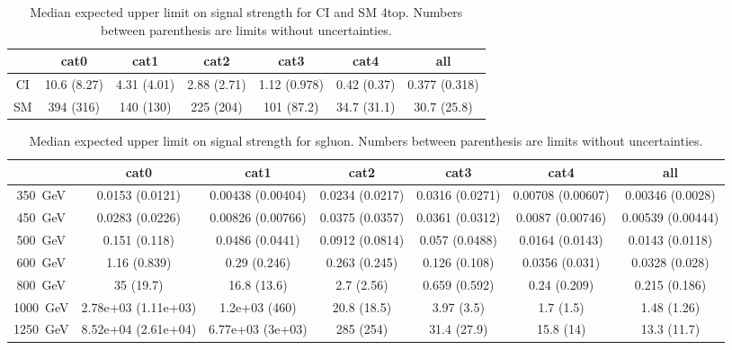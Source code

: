 \documentclass[a4paper,notitlepage]{article}
\begin{document}
\newpage

  \begin{table}
    \begin{center}
      \caption{Median expected upper limit on signal strength for CI and SM 4top. Numbers between parenthesis are limits without uncertainties.}
      \begin{tabular}{ | c | c | c | c | c | c | c | }
	\hline
	        & cat0 & cat1 & cat2 & cat3 & cat4 & all \\ \hline 
	CI      & 10.6  (8.27) & 4.31  (4.01) & 2.88  (2.71) & 1.12  (0.978) & 0.42  (0.37) & 0.377  (0.318) \\ \hline
        SM      & 394  (316)   & 140  (130)   & 225  (204) & 101  (87.2) & 34.7  (31.1) & 30.7  (25.8) \\ \hline

	\hline
      \end{tabular}
    \end{center}
  \end{table}

  \begin{table}
    \begin{center}
      \caption{Median expected upper limit on signal strength for sgluon. Numbers between parenthesis are limits without uncertainties.}
      \begin{tabular}{ | c | c | c | c | c | c | c | }
	\hline
	        & cat0 & cat1 & cat2 & cat3 & cat4 & all \\ \hline 
	350~GeV & 0.0153  (0.0121) & 0.00438  (0.00404) & 0.0234  (0.0217) & 0.0316  (0.0271) & 0.00708  (0.00607) & 0.00346  (0.0028) \\ \hline 
	450~GeV & 0.0283  (0.0226) & 0.00826  (0.00766) & 0.0375  (0.0357) & 0.0361  (0.0312) & 0.0087  (0.00746) & 0.00539  (0.00444) \\ \hline
	500~GeV & 0.151  (0.118) & 0.0486  (0.0441) & 0.0912  (0.0814) & 0.057  (0.0488) & 0.0164  (0.0143) & 0.0143  (0.0118) \\ \hline 
	600~GeV & 1.16  (0.839) & 0.29  (0.246) & 0.263  (0.245) & 0.126  (0.108) & 0.0356  (0.031) & 0.0328  (0.028) \\ \hline 
	800~GeV & 35  (19.7) & 16.8  (13.6) & 2.7  (2.56) & 0.659  (0.592) & 0.24  (0.209) & 0.215  (0.186) \\ \hline 
	1000~GeV& 2.78e+03  (1.11e+03) & 1.2e+03  (460) & 20.8  (18.5) & 3.97  (3.5) & 1.7  (1.5) & 1.48  (1.26) \\ \hline
	1250~GeV& 8.52e+04  (2.61e+04) & 6.77e+03  (3e+03) & 285  (254) & 31.4  (27.9) & 15.8  (14) & 13.3  (11.7) \\ \hline 

	\hline
      \end{tabular}
    \end{center}
  \end{table}
\end{document}
